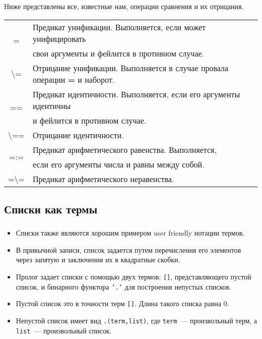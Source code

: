 \begin{frame}

	\frametitle{\insertsection}
	\framesubtitle{\insertsubsection}
	
	Ниже представлены все, известные нам, операции сравнения и их отрицания.
	
	\begin{table}
		\centering
		\begin{tabular}{ c l }
			\multirow{2}{*}{=} & Предикат унификации. Выполняется, если может унифицировать \\ 
			& свои аргументы и фейлится в противном случае. \\
			\textbackslash= & Отрицание унификации. Выполняется в случае провала операции \textbf{=} и наборот. \\
			\multirow{2}{*}{==} & Предикат идентичности. Выполняется, если его аргументы идентичны \\ & и фейлится в противном случае. \\
			\textbackslash== & Отрицание идентичности. \\
			\multirow{2}{*}{=:=} & Предикат арифметического равенства. Выполняется, \\ & если его аргументы числа и равны между собой. \\
			=\textbackslash= & Предикат арифметического неравенства. \\
		\end{tabular}
	\end{table}

\end{frame}


\subsection{Списки как термы}


\begin{frame}

	\frametitle{\insertsection}
	\framesubtitle{\insertsubsection}
	
	\begin{itemize}
		\item Списки также являются хорошим примером user friendly нотации термов.
		\item В привычной записи, список задается путем перечисления его элементов через запятую и заключения их в квадратные скобки.
		\item Пролог задает списки с помощью двух термов: \texttt{[]}, представляющего пустой список, и бинарного функтора \texttt{'.'} для построения непустых списков.
		\item Пустой список это в точности терм \texttt{[]}. Длина такого списка равна 0.
		\item Непустой список имеет вид \texttt{.(term,list)}, где \texttt{term}~--- произвольный терм, а \texttt{list}~--- произвольный список.
	\end{itemize}

\end{frame}


